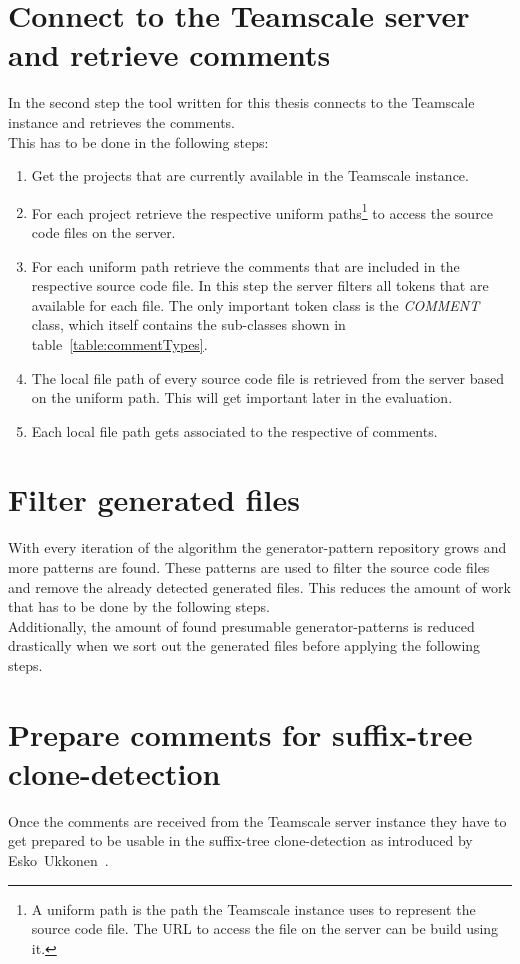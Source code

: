 \section{Connect to the Teamscale server and retrieve comments}
\label{section:retrieveComments}
In the second step the tool written for this thesis connects to the Teamscale instance and retrieves the comments.\\
This has to be done in the following steps:
\begin{enumerate}
	\item Get the projects that are currently available in the Teamscale instance. 
	\item For each project retrieve the respective uniform paths\footnote{A uniform path is the path the Teamscale instance uses to represent the source code file. The URL to access the file on the server can be build using it.} to access the source code files on the server.
	\item For each uniform path retrieve the comments that are included in the respective source code file. In this step the server filters all tokens that are available for each file. The only important token class is the \textit{COMMENT} class, which itself contains the sub-classes shown in table~\ref{table:commentTypes}.
	\item The local file path of every source code file is retrieved from the server based on the uniform path. This will get important later in the evaluation.
	\item Each local file path gets associated to the respective  of comments.
\end{enumerate}


\cleardoublepage{}

\section{Filter generated files}
With every iteration of the algorithm the generator-pattern repository grows and more patterns are found. These patterns are used to filter the source code files and remove the already detected generated files. This reduces the amount of work that has to be done by the following steps. \\
Additionally, the amount of found presumable generator-patterns is reduced drastically when we sort out the generated files before applying the following steps.

\section{Prepare comments for suffix-tree clone-detection}
Once the comments are received from the Teamscale server instance they have to get prepared to be usable in the suffix-tree clone-detection as introduced by Esko~Ukkonen~\cite{Ukkonen1995}.\\

